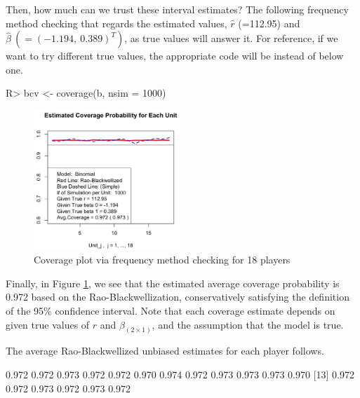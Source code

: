 \documentclass[article]{jss}
\begin{document}
Then, how much can we trust these interval estimates? The following frequency method checking that regards the estimated values, $\hat{r}$ (=112.95) and $\hat{\beta}~(=(-1.194, ~0.389)^{T})$, as true values will answer it. For reference, if we want to try different true values, the appropriate code will be  instead of below one.

\begin{CodeChunk}
\begin{CodeInput}
R> bcv <- coverage(b, nsim = 1000)
\end{CodeInput}
\end{CodeChunk}
\begin{figure}[h]
\begin{center}
\includegraphics[width = 5.5cm]{baseball2.png}
\caption{Coverage plot via frequency method checking for 18 players}
\label{fig:baseball2}
\end{center}
\end{figure}

Finally, in Figure \ref{fig:baseball2}, we see that the estimated average coverage probability is 0.972 based on the Rao-Blackwellization, conservatively satisfying the definition of the 95\% confidence interval. Note that each coverage estimate depends on given true values of $r$ and $\beta_{(2\times1)}$, and the assumption that the model is true.


The average Rao-Blackwellized unbiased estimates for each player follows.
\begin{CodeChunk}
\begin{CodeOutput}
 [1] 0.972 0.972 0.973 0.972 0.972 0.970 0.974 0.972 0.973 0.973 0.973 0.970 
[13] 0.972 0.972 0.973 0.972 0.973 0.972
\end{CodeOutput}
\end{CodeChunk}
\end{document}
